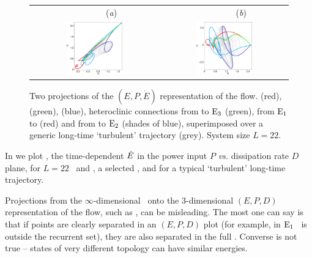 \begin{figure}[t]
\begin{center}
 \begin{tabular}{cc}
        ~~~~~~~~(\textit{a})                        &   ~~~~~~~~(\textit{b}) \\
    \includegraphics[width=0.46\textwidth, clip=true]{figs/connEP.eps}     & \includegraphics[width=0.46\textwidth, clip=true]{figs/connPEdot.eps}
 \end{tabular}
\end{center}
\caption{
Two projections of the $(E,P,\dot{E})$ representation of the flow.
 (red),  (green),  (blue),
heteroclinic connections from  to $\mathrm{E}_{3}$ (green),
from $\mathrm{E}_{1}$ to  (red)
and from  to $\mathrm{E}_{2}$ (shades of blue), superimposed over
a generic long-time `turbulent' trajectory (grey).
System size $L=22$.
        }
\label{f:drivedragConn}
\end{figure}

In  we plot , the time-dependent
$\dot{E}$ in the power input $P$ {\em vs.}
dissipation rate $D$ plane, for $L=22$ \eqva\ and \reqva,
a selected \rpo, and for a typical `turbulent' long-time
trajectory.

Projections from the $\infty$-dimensional \statesp\ onto the 3-dimensional
$(E,P,D)$ representation of the flow, such as
, can be misleading.
The most one can say is that if points are clearly separated in an
$(E,P,D)$ plot (for example, in 
$\mathrm{E}_{1}$ \eqv\ is outside the recurrent set), they are also separated
in the full \statesp.  Converse is not true -- states of
very different topology can have similar energies.

